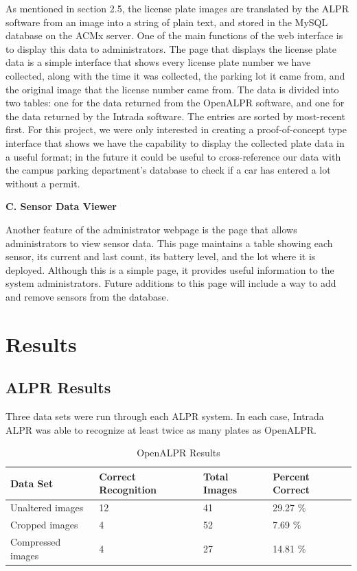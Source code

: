 \documentclass[11pt, oneside, fullpage, doublespace]{article}
\begin{document}
As mentioned in section 2.5, the license plate images are translated by the ALPR software from an image into a string of plain text, and stored in the MySQL database on the ACMx server. One of the main functions of the web interface is to display this data to administrators. The page that displays the license plate data is a simple interface that shows every license plate number we have collected, along with the time it was collected, the parking lot it came from, and the original image that the license number came from. The data is divided into two tables: one for the data returned from the OpenALPR software, and one for the data returned by the Intrada software. The entries are sorted by most-recent first. For this project, we were only interested in creating a proof-of-concept type interface that shows we have the capability to display the collected plate data in a useful format; in the future it could be useful to cross-reference our data with the campus parking department's database to check if a car has entered a lot without a permit.

\textbf{C. Sensor Data Viewer}

Another feature of the administrator webpage is the page that allows administrators to view sensor data. This page maintains a table showing each sensor, its current and last count, its battery level, and the lot where it is deployed. Although this is a simple page, it provides useful information to the system administrators. Future additions to this page will include a way to add and remove sensors from the database.

\section{Results}
\subsection{ALPR Results}
Three data sets were run through each ALPR system. In each case, Intrada ALPR was able to recognize at least twice as many plates as OpenALPR.

\begin{table}[h!]
\begin{center}
\begin{tabular}{| l || l | l | l |}
\hline
Data Set & Correct Recognition & Total Images & Percent Correct \\ \hline
Unaltered images & 12 & 41 & 29.27 \% \\ \hline
Cropped images & 4 & 52 & 7.69 \% \\ \hline
Compressed images & 4 & 27 & 14.81 \% \\ \hline
\end{tabular}
\end{center}
\caption{OpenALPR Results}
\end{table}
\end{document}
